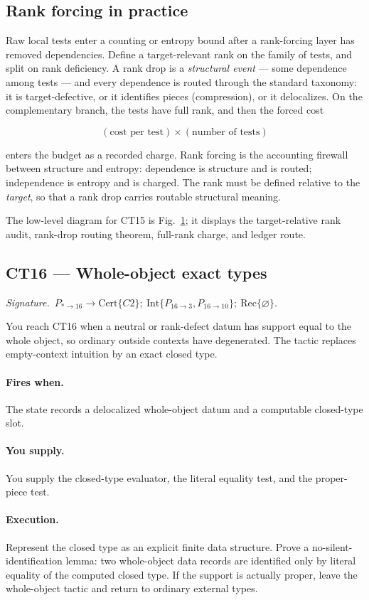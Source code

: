 \documentclass[
  11pt,
]{article}
\theoremstyle{definition}
\newcommand{\ctsignature}[1]{\par\noindent\emph{Signature.}\ #1\par\medskip}
\newcommand{\ctcert}[1]{\mathrm{Cert}\{#1\}}
\newcommand{\ctint}[1]{\mathrm{Int}\{#1\}}
\newcommand{\ctrec}[1]{\mathrm{Rec}\{#1\}}
\newcommand{\ctnone}{\varnothing}
\newcommand{\ctpar}[1]{\paragraph{#1.}}
\begin{document}
\begin{figure}[p]
\label{fig:ct15-rank-forcing}
\end{figure}
\FloatBarrier

\subsection*{Rank forcing in practice}

Raw local tests enter a counting or entropy bound after a rank-forcing
layer has removed dependencies. Define a target-relevant rank on the
family of tests, and split on rank deficiency. A rank drop is a
\emph{structural event} --- some dependence among tests --- and every
dependence is routed through the standard taxonomy: it is
target-defective, or it identifies pieces (compression), or it
delocalizes. On the complementary branch, the tests have full rank, and
then the forced cost

\[
(\text{cost per test}) \times (\text{number of tests})
\]

enters the budget as a recorded charge. Rank forcing is the accounting
firewall between structure and entropy: dependence is structure and is
routed; independence is entropy and is charged. The rank must be defined
relative to the \emph{target}, so that a rank drop carries routable
structural meaning.

The low-level diagram for CT15 is Fig.~\ref{fig:ct15-rank-forcing};
it displays the target-relative rank audit, rank-drop routing theorem,
full-rank charge, and ledger route.



\subsection{CT16 --- Whole-object exact types}\label{ct:16}\label{the-whole-object-piece-exact-types-under-context-degeneracy}
\ctsignature{\(P_{\ast\to16}\to \ctcert{C2};\ \ctint{P_{16\to3},P_{16\to10}};\ \ctrec{\ctnone}\).}

You reach CT16 when a neutral or rank-defect datum has support equal to
the whole object, so ordinary outside contexts have degenerated.  The
tactic replaces empty-context intuition by an exact closed type.

\ctpar{Fires when}
The state records a delocalized whole-object datum and a computable
closed-type slot.

\ctpar{You supply}
You supply the closed-type evaluator, the literal equality test, and the
proper-piece test.

\ctpar{Execution}
Represent the closed type as an explicit finite data structure. Prove a
no-silent-identification lemma: two whole-object data records are
identified only by literal equality of the computed closed type. If the
support is actually proper, leave the whole-object
tactic and return to ordinary external types.
\end{document}
